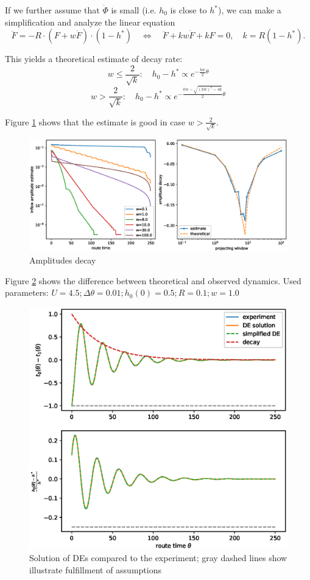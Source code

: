 \documentclass[12pt]{article}
\begin{document}
If we further assume that $\dot{\Phi}$ is small (i.e. $h_0$ is close to $h^*$), we can make a simplification and analyze the linear equation
$$ \ddot{F} = - R \cdot(F + w \dot{F}) \cdot (1-h^*) \quad \Leftrightarrow \quad \ddot{F} + kw\dot{F} + kF = 0 , \quad k = R(1-h^*).$$

This yields a theoretical estimate of decay rate:
$$ w \leq \frac{2}{\sqrt{k}}: \quad h_0 - h^* \propto e^{-\frac{kw}{2} \theta}$$ 
$$w > \frac{2}{\sqrt{k}}: \quad h_0 - h^* \propto e^{-\frac{kw - \sqrt{(kw)^2 - 4k}}{2}\theta}$$

Figure \ref{fig:amplitudes_decay} shows that the estimate is good in case $w > \frac{2}{\sqrt{k}}$.

\begin{figure}
	\includegraphics[scale=0.5]{img/amplitudes_decay.eps}
	\caption{Amplitudes decay }
	\label{fig:amplitudes_decay}

\end{figure}	

Figure \ref{fig:de_comparison} shows the difference between theoretical and observed dynamics. Used parameters: $ U = 4.5; \Delta\theta = 0.01;  h_0(0) = 0.5;  R = 0.1; w = 1.0 $

\begin{figure}
	\includegraphics[scale=0.75]{img/de_comparison.eps}
	\caption{Solution of DEs compared to the experiment; gray dashed lines show illustrate fulfillment of assumptions }
	\label{fig:de_comparison}

\end{figure}	
\end{document}
